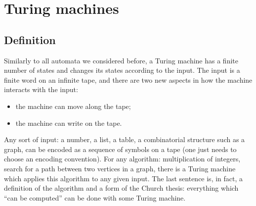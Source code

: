 \section{Turing machines}
\subsection{Definition}
Similarly to all automata we considered before,
a Turing machine has a finite number of states and changes its states according to the input.
The input is a finite word on an infinite tape, and there are two new aspects in how the machine interacts with the input:
\begin{itemize}
\item
the machine can move along the tape;
\item
the machine can write on the tape.
\end{itemize}

Any sort of input: a number, a list, a table, a combinatorial structure such as a graph,
can be encoded as a sequence of symbols on a tape (one just needs to choose an encoding convention).
For any algorithm: multiplication of integers, search for a path between two vertices in a graph,
there is a Turing machine which applies this algorithm to any given input.
The last sentence is, in fact, a definition of the algorithm and a form of the Church thesis:
everything which ``can be computed'' can be done with some Turing machine.
